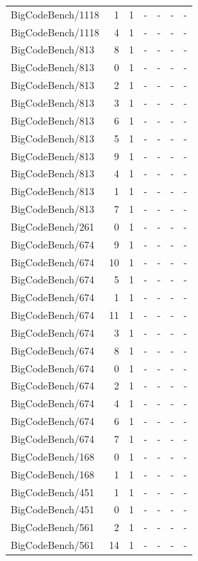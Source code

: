 \begin{longtable}{lrrllll}
BigCodeBench/1118 & 1 & 1 & - & - & - & - \\
BigCodeBench/1118 & 4 & 1 & - & - & - & - \\
BigCodeBench/813 & 8 & 1 & - & - & - & - \\
BigCodeBench/813 & 0 & 1 & - & - & - & - \\
BigCodeBench/813 & 2 & 1 & - & - & - & - \\
BigCodeBench/813 & 3 & 1 & - & - & - & - \\
BigCodeBench/813 & 6 & 1 & - & - & - & - \\
BigCodeBench/813 & 5 & 1 & - & - & - & - \\
BigCodeBench/813 & 9 & 1 & - & - & - & - \\
BigCodeBench/813 & 4 & 1 & - & - & - & - \\
BigCodeBench/813 & 1 & 1 & - & - & - & - \\
BigCodeBench/813 & 7 & 1 & - & - & - & - \\
BigCodeBench/261 & 0 & 1 & - & - & - & - \\
BigCodeBench/674 & 9 & 1 & - & - & - & - \\
BigCodeBench/674 & 10 & 1 & - & - & - & - \\
BigCodeBench/674 & 5 & 1 & - & - & - & - \\
BigCodeBench/674 & 1 & 1 & - & - & - & - \\
BigCodeBench/674 & 11 & 1 & - & - & - & - \\
BigCodeBench/674 & 3 & 1 & - & - & - & - \\
BigCodeBench/674 & 8 & 1 & - & - & - & - \\
BigCodeBench/674 & 0 & 1 & - & - & - & - \\
BigCodeBench/674 & 2 & 1 & - & - & - & - \\
BigCodeBench/674 & 4 & 1 & - & - & - & - \\
BigCodeBench/674 & 6 & 1 & - & - & - & - \\
BigCodeBench/674 & 7 & 1 & - & - & - & - \\
BigCodeBench/168 & 0 & 1 & - & - & - & - \\
BigCodeBench/168 & 1 & 1 & - & - & - & - \\
BigCodeBench/451 & 1 & 1 & - & - & - & - \\
BigCodeBench/451 & 0 & 1 & - & - & - & - \\
BigCodeBench/561 & 2 & 1 & - & - & - & - \\
BigCodeBench/561 & 14 & 1 & - & - & - & - \\

\end{longtable}
